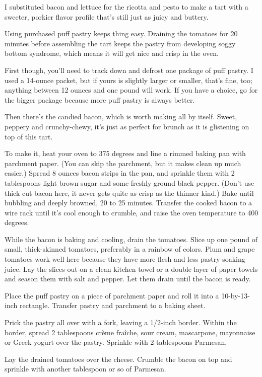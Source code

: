 I substituted bacon and lettuce for the ricotta and pesto to make a tart
with a sweeter, porkier flavor profile that's still just as juicy and
buttery.

Using purchased puff pastry keeps thing easy. Draining the tomatoes for
20 minutes before assembling the tart keeps the pastry from developing
soggy bottom syndrome, which means it will get nice and crisp in the
oven.

First though, you'll need to track down and defrost one package of puff
pastry. I used a 14-ounce packet, but if yours is slightly larger or
smaller, that's fine, too; anything between 12 ounces and one pound will
work. If you have a choice, go for the bigger package because more puff
pastry is always better.

Then there's the candied bacon, which is worth making all by itself.
Sweet, peppery and crunchy-chewy, it's just as perfect for brunch as it
is glistening on top of this tart.

To make it, heat your oven to 375 degrees and line a rimmed baking pan
with parchment paper. (You can skip the parchment, but it makes clean up
much easier.) Spread 8 ounces bacon strips in the pan, and sprinkle them
with 2 tablespoons light brown sugar and some freshly ground black
pepper. (Don't use thick cut bacon here, it never gets quite as crisp as
the thinner kind.) Bake until bubbling and deeply browned, 20 to 25
minutes. Transfer the cooked bacon to a wire rack until it's cool enough
to crumble, and raise the oven temperature to 400 degrees.

While the bacon is baking and cooling, drain the tomatoes. Slice up one
pound of small, thick-skinned tomatoes, preferably in a rainbow of
colors. Plum and grape tomatoes work well here because they have more
flesh and less pastry-soaking juice. Lay the slices out on a clean
kitchen towel or a double layer of paper towels and season them with
salt and pepper. Let them drain until the bacon is ready.

Place the puff pastry on a piece of parchment paper and roll it into a
10-by-13-inch rectangle. Transfer pastry and parchment to a baking
sheet.

Prick the pastry all over with a fork, leaving a 1/2-inch border. Within
the border, spread 2 tablespoons crème fraîche, sour cream, mascarpone,
mayonnaise or Greek yogurt over the pastry. Sprinkle with 2 tablespoons
Parmesan.

Lay the drained tomatoes over the cheese. Crumble the bacon on top and
sprinkle with another tablespoon or so of Parmesan.


